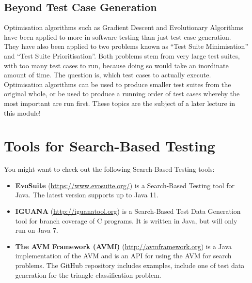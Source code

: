 
\subsection{Beyond Test Case Generation}

Optimisation algorithms such as Gradient Descent and Evolutionary Algorithms
have been applied to more in software testing than just test case generation.
They have also been applied to two problems known as ``Test Suite Minimisation''
and ``Test Suite Prioritisation''. Both problems stem from very large test
suites, with too many test cases to run, because doing so would take an
inordinate amount of time. The question is, which test cases to actually
execute. Optimisation algorithms can be used to produce smaller test suites from
the original whole, or be used to produce a running order of test cases whereby
the most important are run first. These topics are the subject of a later
lecture in this module!


\section{Tools for Search-Based Testing}

You might want to check out the following Search-Based Testing tools:

\begin{itemize}

    \item {\bf EvoSuite} (\url{https://www.evosuite.org/}) is a Search-Based
    Testing tool for Java. The latest version supports up to Java 11.

    \item {\bf IGUANA} (\url{http://iguanatool.org}) is a Search-Based Test Data
    Generation tool for branch coverage of C programs. It is written in Java,
    but will only run on Java 7.

    \item {\bf The AVM Framework (AVMf)} (\url{http://avmframework.org}) is a
    Java implementation of the AVM and is an API for using the AVM for search
    problems. The GitHub repository includes examples, include one of test data
    generation for the triangle classification problem.

\end{itemize}

